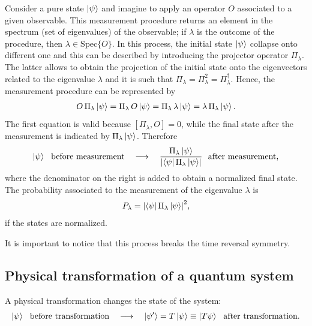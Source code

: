 Consider a pure state $\ket{\psi}$ and imagine to apply an operator $O$ associated to a given observable. This measurement procedure returns an element in the spectrum (set of eigenvalues) of the observable; if $\lambda$ is the outcome of the procedure, then $\lambda \in \text{Spec}\{O\}$. In this process, the initial state $\ket{\psi}$ collapse onto different one and this can be described by introducing the projector operator $\Pi_\lambda$. The latter allows to obtain the projection of the initial state onto the eigenvectors related to the eigenvalue $\lambda$ and it is such that $\Pi_\lambda = \Pi_\lambda^2 = \Pi_\lambda^\dagger$. Hence, the measurement procedure can be represented by
\begin{align}
    \label{eq:meas}
    O \, \Pi_\lambda \ket{\psi} = \Pi_\lambda \, O \ket{\psi} =  \Pi_\lambda \, \lambda \ket{\psi} = \lambda \,\Pi_\lambda \ket{\psi}. 
\end{align}
The first equation is valid because $[\Pi_\lambda, O] = 0$, while the final state after the measurement is indicated by $\Pi_\lambda \ket{\psi}$. Therefore
\begin{align*}
    \ket{\psi} ~~ \text{before measurement} ~~~\longrightarrow~~~ \frac{\Pi_\lambda \ket{\psi}}{ \abs{\bra{\psi} \Pi_\lambda \ket{\psi}}} ~~ \text{after measurement,}
\end{align*}
where the denominator on the right is added to obtain a normalized final state. 
\newline
The probability associated to the measurement of the eigenvalue $\lambda$ is
\begin{align}
    P_\lambda = \abs{\bra{\psi} \Pi_\lambda \ket{\psi}}^2, 
\end{align}
if the states are normalized. 

It is important to notice that this process breaks the time reversal symmetry. 

\subsection{Physical transformation of a quantum system}

A physical transformation changes the state of the system:
\begin{align*}
    \ket{\psi} ~~ \text{before transformation} ~~~\longrightarrow~~~  \ket{\psi'} = T \ket{\psi} \equiv \ket{T\psi} ~~ \text{after transformation.}
\end{align*}

